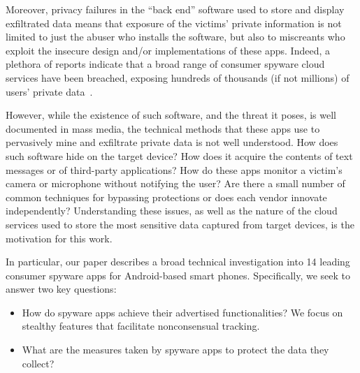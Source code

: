 Moreover, privacy failures in the ``back end'' software used to store and
display exfiltrated data means that exposure of the victims' private information is not limited to just the abuser who installs the software, but also to miscreants who exploit the insecure design and/or implementations of these apps.
Indeed, a plethora of reports indicate that a broad range of consumer spyware cloud services have been breached,
exposing hundreds of thousands (if not millions) of users' private data~\cite{HackerSt66:online,Companyt8:online,mSpybrea38:online,mSpyCybe86:online,Cerberus12:online,Stalkerw59:online,HackerSt50:online,Spywaref13:online,RetinaXa98:online,Hackercl62:online}.

However, while the existence of such software, and the threat it poses,
is well documented in mass media, the technical methods that these apps use to pervasively mine and exfiltrate private data is not well understood.
How does such software hide on
the target device?  How does it acquire the contents of text messages
or of third-party applications? How do these apps monitor a victim's camera or microphone without notifying the user?  Are there a small number of
common techniques for bypassing protections or does each vendor
innovate independently?  Understanding these issues, as well as the
nature of the cloud services used to store the most sensitive data
captured from target devices, is the motivation for this work.

In particular, our paper describes a broad technical investigation
into 14 leading consumer spyware apps for Android-based smart
phones.
Specifically, we seek to answer two key questions:
\begin{itemize}
    \item How do spyware apps achieve their advertised functionalities? We focus on stealthy features that facilitate nonconsensual tracking.
    \item What are the measures taken by spyware apps to protect the data they collect?
\end{itemize}

